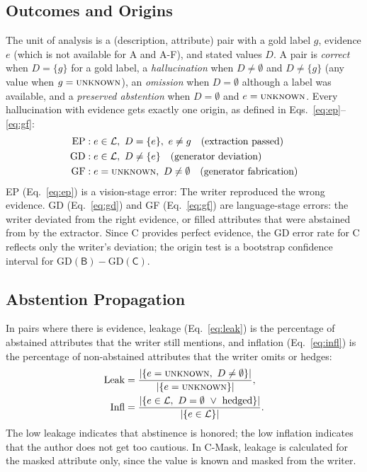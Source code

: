 \documentclass[runningheads]{llncs}
\newcommand{\unk}{\textsc{unknown}}
\newcommand{\cond}[1]{\textsf{#1}}
\begin{document}
\subsection{Outcomes and Origins}
The unit of analysis is a (description, attribute) pair with a gold label $g$, evidence $e$ (which is not available for \cond{A} and \cond{A-F}), and stated values $D$. A pair is \emph{correct} when $D=\{g\}$ for a gold label, a \emph{hallucination} when $D\neq\emptyset$ and $D\neq\{g\}$ (any value when $g=\unk$), an \emph{omission} when $D=\emptyset$ although a label was available, and a \emph{preserved abstention} when $D=\emptyset$ and $e=\unk$. Every hallucination with evidence gets exactly one origin, as defined in Eqs.~\ref{eq:ep}--\ref{eq:gf}:
\begin{align}
\text{EP}&: e\in\mathcal{L},\ D=\{e\},\ e\neq g \quad\text{(extraction passed)}\label{eq:ep}\\
\text{GD}&: e\in\mathcal{L},\ D\neq\{e\} \quad\text{(generator deviation)}\label{eq:gd}\\
\text{GF}&: e=\unk,\ D\neq\emptyset \quad\text{(generator fabrication)}\label{eq:gf}
\end{align}
EP (Eq.~\ref{eq:ep}) is a vision-stage error: The writer reproduced the wrong evidence. GD (Eq.~\ref{eq:gd}) and GF (Eq.~\ref{eq:gf}) are language-stage errors: the writer deviated from the right evidence, or filled attributes that were abstained from by the extractor. Since \cond{C} provides perfect evidence, the GD error rate for \cond{C} reflects only the writer's deviation; the origin test is a bootstrap confidence interval for $\mathrm{GD}(\cond{B}) - \mathrm{GD}(\cond{C})$.

\subsection{Abstention Propagation}
In pairs where there is evidence, leakage (Eq.~\ref{eq:leak}) is the percentage of abstained attributes that the writer still mentions, and inflation (Eq.~\ref{eq:infl}) is the percentage of non-abstained attributes that the writer omits or hedges:
\begin{align}
\mathrm{Leak}&=\frac{|\{e=\unk,\ D\neq\emptyset\}|}{|\{e=\unk\}|},\label{eq:leak}\\
\mathrm{Infl}&=\frac{|\{e\in\mathcal{L},\ D=\emptyset\ \lor\ \text{hedged}\}|}{|\{e\in\mathcal{L}\}|}.\label{eq:infl}
\end{align}
The low leakage indicates that abstinence is honored; the low inflation indicates that the author does not get too cautious. In \cond{C-Mask}, leakage is calculated for the masked attribute only, since the value is known and masked from the writer.
\end{document}
